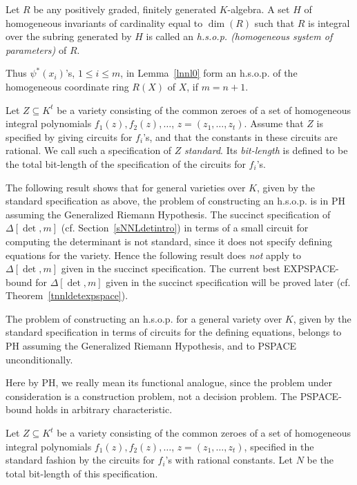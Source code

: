\documentclass[11pt]{article}
\begin{document}
\begin{defn} \label{dhsop} \cite{eisenbudbook}
Let $R$ be any positively graded, finitely generated  $K$-algebra. 
A set $H$ of homogeneous invariants of  cardinality equal to $\dim(R)$ such that $R$ is integral over the subring
generated by $H$ is called an {\em h.s.o.p. (homogeneous system of parameters)}  
of $R$.
\end{defn}

Thus $\psi^*(x_i)$'s, $1 \le i \le m$, in
Lemma~\ref{lnnl0} form an h.s.o.p. of the homogeneous coordinate ring $R(X)$ of $X$, if $m=n+1$.

Let $Z \subseteq K^t$ be a variety consisting of the common zeroes  of a set of homogeneous 
integral polynomials $f_1(z), f_2(z),\ldots$, $z=(z_1,\ldots,z_t)$.  Assume that 
$Z$ is specified  by 
giving circuits  for  $f_i$'s, and that the constants in these circuits 
are rational.
We call such a specification of $Z$ {\em standard}.
Its {\em bit-length}  is defined to be 
the total bit-length of the specification of the circuits  for  $f_i$'s. 


The following result shows  that for  general varieties  over $K$,
given by the standard specification as above, 
the   problem of constructing an h.s.o.p. is  in  PH assuming the Generalized Riemann Hypothesis.  The succinct specification  of $\Delta[\det,m]$ (cf. 
Section~\ref{sNNLdetintro}) in terms of a small circuit for computing the determinant
is not standard, since it does not specify defining equations for 
the variety.
Hence the  following result does {\em not} apply to $\Delta[\det,m]$ given in the succinct specification. The current best EXPSPACE-bound
for $\Delta[\det,m]$ given in  the succinct  specification will be proved later (cf. Theorem~\ref{tnnldetexpspace}).

\begin{theorem} \label{tnoetherph}
The  problem of constructing an h.s.o.p.  for a general variety over $K$,
given by  the standard specification  in terms of circuits for the 
defining equations,   belongs to PH assuming the Generalized Riemann Hypothesis,
and to PSPACE unconditionally.
\end{theorem}

Here by PH, we  really mean its functional analogue, since the problem under consideration is a construction problem, not a 
decision problem.
The PSPACE-bound holds in arbitrary characteristic.

\proof 
Let $Z \subseteq K^t$ be a variety consisting of the common zeroes  of a set of homogeneous 
integral polynomials $f_1(z), f_2(z),\ldots$, $z=(z_1,\ldots,z_t)$, specified 
in the standard fashion  by the  circuits  for  $f_i$'s with rational constants.
Let $N$ be the total  bit-length of this specification.
\end{document}
